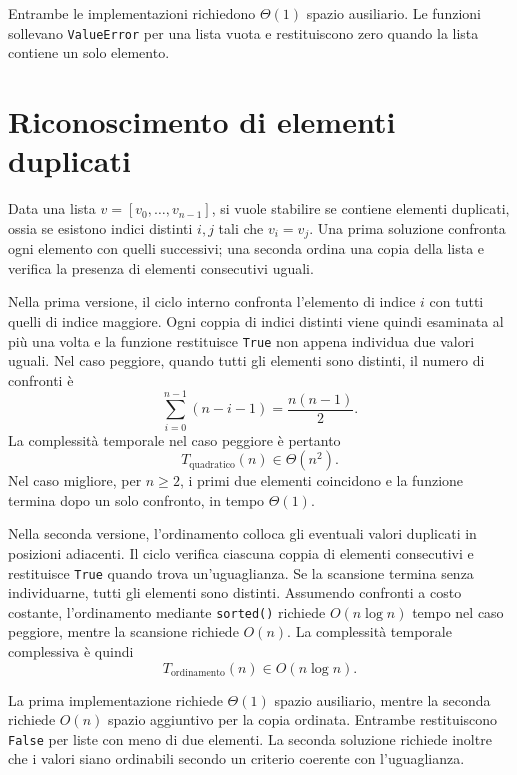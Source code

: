 Entrambe le implementazioni richiedono \(\Theta(1)\) spazio ausiliario.
Le funzioni sollevano \texttt{ValueError} per una lista vuota e
restituiscono zero quando la lista contiene un solo elemento.

\clearpage

\section{Riconoscimento di elementi duplicati}
\label{sec:fi-complessita-duplicati}

Data una lista \(v=[v_0,\ldots,v_{n-1}]\), si vuole stabilire
se contiene elementi duplicati, ossia se esistono indici distinti
\(i,j\) tali che \(v_i=v_j\). Una prima soluzione confronta ogni
elemento con quelli successivi; una seconda ordina una copia della
lista e verifica la presenza di elementi consecutivi uguali.



Nella prima versione, il ciclo interno confronta l'elemento di indice
\(i\) con tutti quelli di indice maggiore. Ogni coppia di indici
distinti viene quindi esaminata al più una volta e la funzione
restituisce \texttt{True} non appena individua due valori uguali.
Nel caso peggiore, quando tutti gli elementi sono distinti,
il numero di confronti è
\[
  \sum_{i=0}^{n-1}(n-i-1)
  =\frac{n(n-1)}2.
\]
La complessità temporale nel caso peggiore è pertanto
\[
  T_{\mathrm{quadratico}}(n)\in\Theta(n^2).
\]
Nel caso migliore, per \(n\ge2\), i primi due elementi coincidono
e la funzione termina dopo un solo confronto, in tempo \(\Theta(1)\).

Nella seconda versione, l'ordinamento colloca gli eventuali valori
duplicati in posizioni adiacenti. Il ciclo verifica ciascuna coppia
di elementi consecutivi e restituisce \texttt{True} quando trova
un'uguaglianza. Se la scansione termina senza individuarne, tutti
gli elementi sono distinti. Assumendo confronti a costo costante,
l'ordinamento mediante \texttt{sorted()} richiede \(O(n\log n)\) tempo nel caso peggiore,
mentre la scansione richiede \(O(n)\). La complessità temporale
complessiva è quindi
\[
  T_{\mathrm{ordinamento}}(n)\in O(n\log n).
\]

La prima implementazione richiede \(\Theta(1)\) spazio ausiliario,
mentre la seconda richiede \(O(n)\) spazio aggiuntivo per la copia
ordinata. Entrambe restituiscono \texttt{False} per liste con meno
di due elementi. La seconda soluzione richiede inoltre che i valori
siano ordinabili secondo un criterio coerente con l'uguaglianza.

